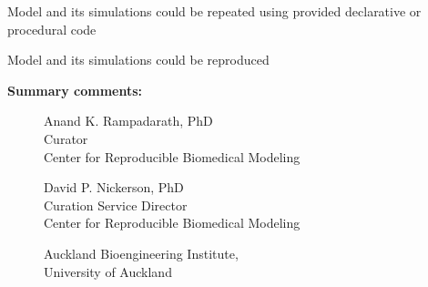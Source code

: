 \documentclass{article}
\newcommand{\absent}{\raisebox{0pt}{\tikz{\node[draw,scale=0.7,regular polygon, regular polygon sides=4,fill=none](){};}}}
\begin{document}
\begin{tcolorbox}[
colback=white,
arc=0pt,
outer arc=0pt,
colframe=white,
top=2mm,
toptitle=2mm,
bottomtitle=2mm,
colbacktitle=white!80!black,
colframe=black,
coltitle=black, 
title= \textbf{Box 4:} Evaluation]
\begin{todolist}
    \item[\absent] Model and its simulations could be repeated using provided declarative or procedural code
    \item[\absent] Model and its simulations could be reproduced
\end{todolist}
\end{tcolorbox}


\newpage
\bigskip
\noindent
\textbf{Summary comments:} 


\bigskip
\bigskip
\bigskip
\begin{figure}[ht]
\begin{minipage}[b]{0.45\linewidth}
\centering
Anand K. Rampadarath\footnotemark, PhD
\\
Curator
\\
Center for Reproducible Biomedical Modeling
\end{minipage}
\hspace{0.5cm}
\begin{minipage}[b]{0.45\linewidth}
\centering
David P. Nickerson, PhD
\\
Curation Service Director
\\
Center for Reproducible Biomedical Modeling
\end{minipage}
\end{figure}
\begin{figure}[ht]
\centering
Auckland Bioengineering Institute,
\\
University of Auckland
\end{figure}
\end{document}
